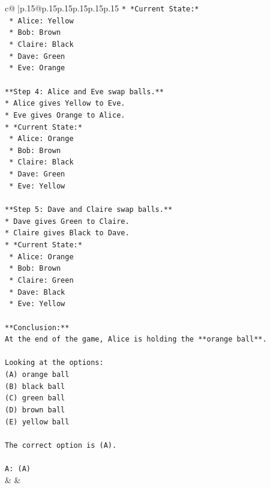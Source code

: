 \documentclass{article}
\begin{document}
{\begin{supertabular}{c@{$\;$}|p{.15\linewidth}@{}p{.15\linewidth}p{.15\linewidth}p{.15\linewidth}p{.15\linewidth}p{.15\linewidth}}
{{{\texttt{*   *Current State:*} \\
\texttt{    *   Alice: Yellow} \\
\texttt{    *   Bob: Brown} \\
\texttt{    *   Claire: Black} \\
\texttt{    *   Dave: Green} \\
\texttt{    *   Eve: Orange} \\
\\ 
\texttt{**Step 4: Alice and Eve swap balls.**} \\
\texttt{*   Alice gives Yellow to Eve.} \\
\texttt{*   Eve gives Orange to Alice.} \\
\texttt{*   *Current State:*} \\
\texttt{    *   Alice: Orange} \\
\texttt{    *   Bob: Brown} \\
\texttt{    *   Claire: Black} \\
\texttt{    *   Dave: Green} \\
\texttt{    *   Eve: Yellow} \\
\\ 
\texttt{**Step 5: Dave and Claire swap balls.**} \\
\texttt{*   Dave gives Green to Claire.} \\
\texttt{*   Claire gives Black to Dave.} \\
\texttt{*   *Current State:*} \\
\texttt{    *   Alice: Orange} \\
\texttt{    *   Bob: Brown} \\
\texttt{    *   Claire: Green} \\
\texttt{    *   Dave: Black} \\
\texttt{    *   Eve: Yellow} \\
\\ 
\texttt{**Conclusion:**} \\
\texttt{At the end of the game, Alice is holding the **orange ball**.} \\
\\ 
\texttt{Looking at the options:} \\
\texttt{(A) orange ball} \\
\texttt{(B) black ball} \\
\texttt{(C) green ball} \\
\texttt{(D) brown ball} \\
\texttt{(E) yellow ball} \\
\\ 
\texttt{The correct option is (A).} \\
\\ 
\texttt{A: (A)} \\
            }
        }
    }
    & & \\ \\


\end{supertabular}}
\end{document}
